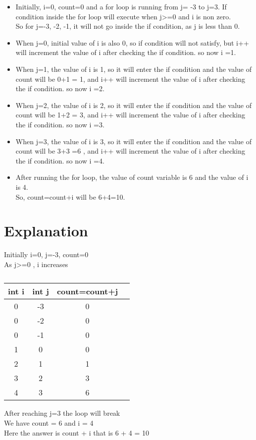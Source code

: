\documentclass[journal,12pt,twocolumn]{IEEEtran}
\begin{document}
\begin{itemize}
    \item  Initially, i=0, count=0 and a for loop is running from j= -3 to j=3. If condition inside the for loop will execute when j>=0 and i is non zero.\\
    So for j=-3, -2, -1, it will not go inside the if condition, as j is less than 0.
    \item When j=0, initial value of i is also 0, so if condition will not satisfy, but i++ will increment the value of i after checking the if condition. so now i =1.
    \item When j=1, the value of i is 1, so it will enter the if condition and the value of count will be 0+1 = 1, and i++ will increment the value of i after checking the if condition. so now i =2.
    \item When j=2, the value of i is 2, so it will enter the if condition and the value of count will be 1+2 = 3, and i++ will increment the value of i after checking the if condition. so now i =3.
     \item When j=3, the value of i is 3, so it will enter the if condition and the value of count will be 3+3 =6 , and i++ will increment the value of i after checking the if condition. so now i =4.
    \item After running the for loop, the value of count variable is 6 and the value of i is 4.\\ \vspace{0.1in}\vspace{0.1in}
    So, count=count+i will be 6+4=10.\\ 
\end{itemize}

\chapter{\textbf{Explanation}}

 Initially i=0, j=-3, count=0 \\
 As j>=0 , i increases \\

    \begin{table}[ht]
        \centering
        \begin{tabular}{|c|c|c|c|}
        \hline
        int i & int j & count=count+j \\
        \hline
        0 & -3 & 0 \\
        \hline
        0 & -2 & 0 \\
        \hline
        0 & -1 & 0 \\
        \hline
        1 &  0 & 0 \\
        \hline
        2 &  1 & 1 \\
        \hline
        3 &  2 & 3 \\
        \hline
        4 &  3 & 6 \\
        \hline
        \end{tabular}
        \caption{}
        \label{}
    \end{table}
 After reaching j=3 the loop will break\\
 We have count = 6 and i = 4 \\
 Here the answer is count + i that is 6 + 4 = 10
\end{document}
